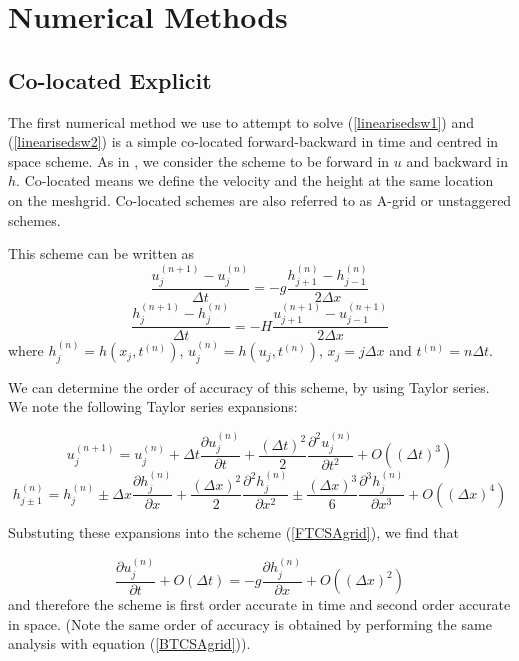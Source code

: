 \documentclass[a4paper,12pt, notitlepage]{article}
\begin{document}
\section{Numerical Methods}\label{numericalmethodssection}

\subsection {Co-located Explicit}
The first numerical method we use to attempt to solve (\ref{linearisedsw1}) and (\ref{linearisedsw2}) is a simple co-located forward-backward in time and centred in space scheme. As in \cite{MPE textbook}, we consider the scheme to be forward in $u$ and backward in $h$. Co-located means we define the velocity and the height at the same location on the meshgrid. Co-located schemes are also referred to as A-grid or unstaggered schemes.

This scheme can be written as 
\begin{equation} \label{FTCSAgrid}
\frac{u_{j}^{(n+1)} - u_{j}^{(n)}}{\Delta t} = -g \frac{h_{j+1}^{(n)} - h_{j-1}^{(n)}}{2\Delta x}
\end{equation}
\begin{equation}\label{BTCSAgrid}
\frac{h_{j}^{(n+1)} - h_{j}^{(n)}}{\Delta t} = -H \frac{u_{j+1}^{(n+1)} - u_{j-1}^{(n+1)}}{2\Delta x}
\end{equation}
where $h_{j}^{(n)} = h(x_{j}, t^{(n)})$, $u_{j}^{(n)} = h(u_{j}, t^{(n)})$, $x_{j} = j\Delta x$ and $t^{(n)} = n\Delta t$. 

We can determine the order of accuracy of this scheme, by using Taylor series. We note the following Taylor series expansions:

\begin{equation}\label{ujn+1}
u_{j}^{(n+ 1)} = u_{j}^{(n)} + \Delta t \frac{\partial u_{j}^{(n)}}{\partial t} + \frac{(\Delta t)^{2}}{2}\frac{\partial^{2} u_{j}^{(n)}}{\partial t^{2}} + O((\Delta t)^{3})
\end{equation}
\begin{equation}\label{hj+-1n}
h_{j \pm 1}^{(n)} = h_{j}^{(n)} \pm \Delta x  \frac{\partial h_{j}^{(n)}}{\partial x} + \frac{(\Delta x)^{2}}{2}\frac{\partial^{2} h_{j}^{(n)}}{\partial x^{2}} \pm \frac{(\Delta x)^{3}}{6}\frac{\partial^{3} h_{j}^{(n)}}{\partial x^{3}} + O((\Delta x)^{4})
\end{equation}

Substuting these expansions into the scheme (\ref{FTCSAgrid}), we find that 

\begin{equation}
\frac{\partial u_{j}^{(n)}}{\partial t} + O(\Delta t) =  -g \frac{\partial h_{j}^{(n)}}{\partial x} + O((\Delta x)^{2})
\end{equation} 
and therefore the scheme is first order accurate in time and second order accurate in space. (Note the same order of accuracy is obtained by performing the same analysis with equation (\ref{BTCSAgrid})).
\end{document}
